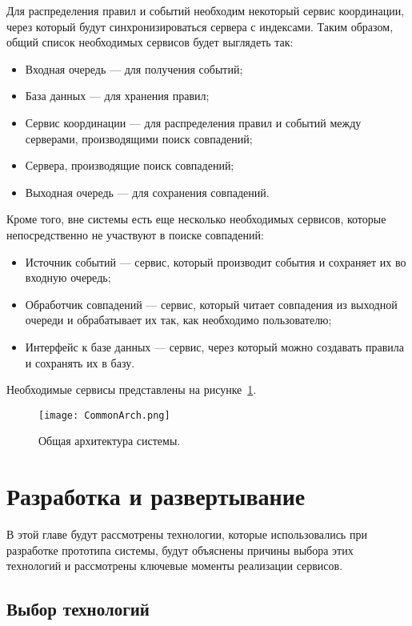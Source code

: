 \documentclass[14pt]{article}
\begin{document}
Для распределения правил и событий необходим некоторый сервис координации, через который будут синхронизироваться сервера с индексами. Таким образом, общий список необходимых сервисов будет выглядеть так:
\begin{itemize}
    \item Входная очередь --- для получения событий;
    \item База данных --- для хранения правил;
    \item Сервис координации --- для распределения правил и событий между серверами, производящими поиск совпадений;
    \item Сервера, производящие поиск совпадений;
    \item Выходная очередь --- для сохранения совпадений.
\end{itemize}
Кроме того, вне системы есть еще несколько необходимых сервисов, которые непосредственно не участвуют в поиске совпадений:
\begin{itemize}
    \item Источник событий --- сервис, который производит события и сохраняет их во входную очередь;
    \item Обработчик совпадений --- сервис, который читает совпадения из выходной очереди и обрабатывает их так, как необходимо пользователю;
    \item Интерфейс к базе данных --- сервис, через который можно создавать правила и сохранять их в базу.
\end{itemize}
Необходимые сервисы представлены на рисунке~\ref{fig:commonArch}.

\begin{figure}[h]
  \centering
    \texttt{[image: CommonArch.png]}
    \caption{Общая архитектура системы.}
    \label{fig:commonArch}
\end{figure}

\section{Разработка и развертывание}
В этой главе будут рассмотрены технологии, которые использовались при разработке прототипа системы, будут объяснены причины выбора этих технологий и рассмотрены ключевые моменты реализации сервисов.

\subsection{Выбор технологий}
\end{document}
